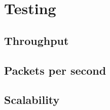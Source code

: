 \chapter{Testing}

\section{Throughput}
\label{sec:throughput}

\section{Packets per second}
\label{sec:pps}

\section{Scalability}
\label{sec:scalability}
